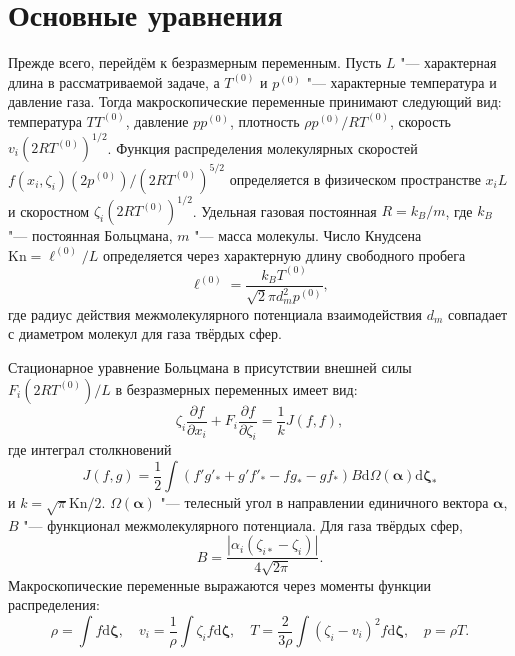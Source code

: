 \documentclass[
aps,%
12pt,%
final,%
notitlepage,%
oneside,%
onecolumn,%
nobibnotes,%
nofootinbib,%
superscriptaddress,%
noshowpacs,%
showkeys,%
floatfix,%
tightenlines,%
centertags]%
{revtex4}
\newcommand{\Kn}{\mathrm{Kn}}
\newcommand{\dd}{\mathrm{d}}
\newcommand{\pder}[2][]{\frac{\partial#1}{\partial#2}}
\newcommand{\dzeta}{\boldsymbol{\dd\zeta}}
\begin{document}
\section{Основные уравнения}

Прежде всего, перейдём к безразмерным переменным.
Пусть \(L\) "--- характерная длина в рассматриваемой задаче,
а \(T^{(0)}\) и \(p^{(0)}\) "--- характерные температура и давление газа.
Тогда макроскопические переменные принимают следующий вид:
температура \(TT^{(0)}\), давление \(pp^{(0)}\),
плотность \(\rho p^{(0)}/RT^{(0)}\), скорость \(v_i(2RT^{(0)})^{1/2}\).
Функция распределения молекулярных скоростей \(f(x_i,\zeta_i)(2p^{(0)})/(2RT^{(0)})^{5/2}\)
определяется в физическом пространстве \(x_iL\) и скоростном \(\zeta_i(2RT^{(0)})^{1/2}\).
Удельная газовая постоянная \(R = k_B/m\), где \(k_B\) "--- постоянная Больцмана,
\(m\) "--- масса молекулы.
Число Кнудсена \(\Kn = \ell^{(0)}/L\) определяется через характерную длину свободного пробега
\begin{equation}\label{eq:ell}
    \ell^{(0)} = \frac{k_B T^{(0)}}{\sqrt2\pi d_m^2 p^{(0)}},
\end{equation}
где радиус действия межмолекулярного потенциала взаимодействия \(d_m\)
совпадает с диаметром молекул для газа твёрдых сфер.

Стационарное уравнение Больцмана в присутствии внешней силы \(F_i (2RT^{(0)})/L\) в безразмерных переменных имеет вид:
\begin{equation}\label{eq:Boltzmann}
    \zeta_i\pder[f]{x_i} + F_i\pder[f]{\zeta_i} = \frac1k J(f,f),
\end{equation}
где интеграл столкновений
\begin{equation}\label{eq:integral}
    J(f,g) = \frac12 \int(f'g'_*+g'f'_*-fg_*-gf_*)B\dd\Omega(\boldsymbol\alpha) \dzeta_*
\end{equation}
и \(k = \sqrt\pi\Kn/2\).
\(\Omega(\boldsymbol{\alpha})\) "--- телесный угол в направлении единичного вектора \(\boldsymbol\alpha\),
\(B\) "--- функционал межмолекулярного потенциала. Для газа твёрдых сфер,
\begin{equation}\label{eq:ci_kernel}
    B = \frac{|\alpha_i(\zeta_{i*}-\zeta_i)|}{4\sqrt{2\pi}}.
\end{equation}
Макроскопические переменные выражаются через моменты функции распределения:
\begin{equation}\label{eq:macro}
    \rho = \int f \dzeta, \quad
    v_i = \frac1{\rho} \int \zeta_i f \dzeta, \quad
    T = \frac{2}{3\rho}\int(\zeta_i-v_i)^2 f \dzeta, \quad
    p = \rho T.
\end{equation}
\end{document}
